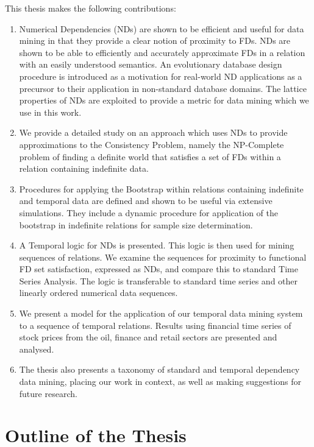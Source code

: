 This thesis makes the following contributions:
\begin{enumerate}
\item Numerical Dependencies (NDs) are shown to be efficient and useful for 
data mining in that they provide a clear notion of proximity to FDs.
NDs are shown to be able to efficiently and accurately approximate FDs
in a relation with an easily understood semantics. 
An evolutionary database design procedure is introduced as a 
motivation for real-world ND applications as a precursor to their application
in non-standard database domains. The lattice properties of NDs are
exploited to provide a metric for data mining which we use in this work. 
\item We provide a detailed study on an approach which uses NDs to
provide approximations to the Consistency Problem, namely the
NP-Complete problem of finding a definite world that satisfies a set
of FDs within a relation containing indefinite data. 
\item Procedures for applying the Bootstrap within relations containing
indefinite and temporal data are defined and shown to be useful via extensive
simulations. They include a dynamic procedure for application of the
bootstrap in indefinite relations for sample size determination. 
\item A Temporal logic for NDs is presented. This logic is then used
for mining sequences of relations. We examine the sequences for proximity
to functional FD set satisfaction, expressed as NDs, and compare this
to standard Time Series 
Analysis. The logic is transferable to standard time series and other
linearly ordered numerical data sequences.
\item We present a model for the application of our temporal data
mining system to a sequence of temporal relations. Results using
financial time series of stock prices from the oil,
finance and retail sectors are presented and analysed.
\item The thesis also presents a taxonomy of standard and temporal 
dependency data mining, 
placing our work in context, as well as making suggestions for future research.
\end{enumerate}




\section{Outline of the Thesis}\label{sec:int_outline}

